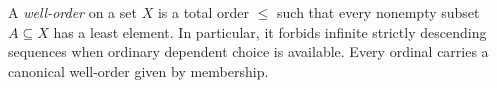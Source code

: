 
A \emph{well-order} on a set $X$ is a total order $\le$ such that every nonempty subset $A\subseteq X$ has a least element. In particular, it forbids infinite strictly descending sequences when ordinary dependent choice is available. Every ordinal carries a canonical well-order given by membership.
